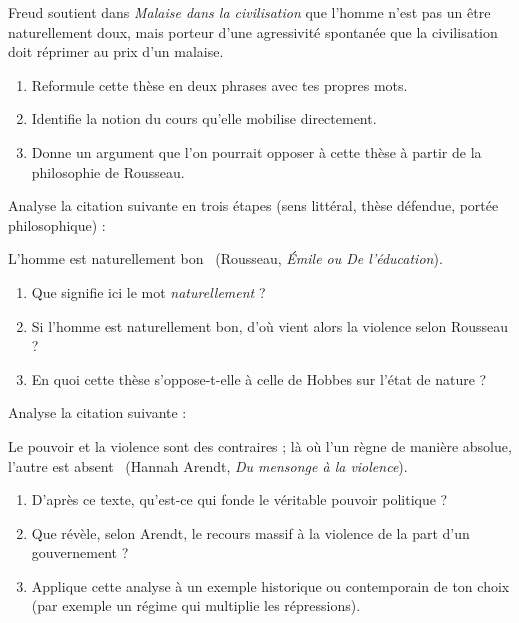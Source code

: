 \documentclass[11pt]{article}
\newcounter{popsec}
\newcounter{popsub}
\newcommand{\courssub}[1]{%
  \stepcounter{popsub}%
  \par\vspace{9pt}\noindent{\popxbold\fontsize{11.5}{13}\selectfont\color{popink}{\color{poporange}\thepopsec.\thepopsub}\hspace{6pt}#1}\par\nopagebreak\vspace{4pt}
}
\begin{document}
\courssub{Je m'entraîne}

\begin{exercice}
Freud soutient dans \emph{Malaise dans la civilisation} que l'homme n'est pas un être naturellement doux, mais porteur d'une agressivité spontanée que la civilisation doit réprimer au prix d'un malaise.
\begin{enumerate}
\item Reformule cette thèse en deux phrases avec tes propres mots.
\item Identifie la notion du cours qu'elle mobilise directement.
\item Donne un argument que l'on pourrait opposer à cette thèse à partir de la philosophie de Rousseau.
\end{enumerate}
\end{exercice}

\begin{exercice}
Analyse la citation suivante en trois étapes (sens littéral, thèse défendue, portée philosophique) :

\guillemotleft L'homme est naturellement bon \guillemotright\ (Rousseau, \emph{Émile ou De l'éducation}).

\begin{enumerate}
\item Que signifie ici le mot \emph{naturellement} ?
\item Si l'homme est naturellement bon, d'où vient alors la violence selon Rousseau ?
\item En quoi cette thèse s'oppose-t-elle à celle de Hobbes sur l'état de nature ?
\end{enumerate}
\end{exercice}

\begin{exercice}
Analyse la citation suivante :

\guillemotleft Le pouvoir et la violence sont des contraires ; là où l'un règne de manière absolue, l'autre est absent \guillemotright\ (Hannah Arendt, \emph{Du mensonge à la violence}).

\begin{enumerate}
\item D'après ce texte, qu'est-ce qui fonde le véritable pouvoir politique ?
\item Que révèle, selon Arendt, le recours massif à la violence de la part d'un gouvernement ?
\item Applique cette analyse à un exemple historique ou contemporain de ton choix (par exemple un régime qui multiplie les répressions).
\end{enumerate}
\end{exercice}
\end{document}
